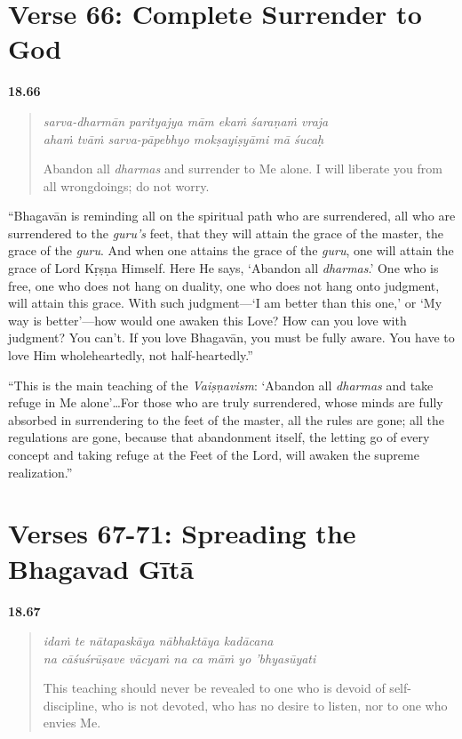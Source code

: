 \section{Verse 66: Complete Surrender to God}\label{sec-verse-66-complete-surrender-to-god}


\par\noindent\textbf{18.66}\par
\begin{verse}
\textit{sarva-dharmān parityajya mām ekaṁ śaraṇaṁ vraja} \\
\textit{ahaṁ tvāṁ sarva-pāpebhyo mokṣayiṣyāmi mā śucaḥ}

\noindent Abandon all \textit{dharmas} and surrender to Me alone. I will liberate you from all wrongdoings; do not worry.
\end{verse}
\par


\enquote{Bhagavān is reminding all on the spiritual path who are surrendered, all who are surrendered to the \textit{guru’s} feet, that they will attain the grace of the master, the grace of the \textit{guru}. And when one attains the grace of the \textit{guru}, one will attain the grace of Lord Kṛṣṇa Himself. Here He says, \enquote{Abandon all \textit{dharmas}.} One who is free, one who does not hang on duality, one who does not hang onto judgment, will attain this grace. With such judgment---\enquote{I am better than this one,} or \enquote{My way is better}---how would one awaken this Love? How can you love with judgment? You can’t. If you love Bhagavān, you must be fully aware. You have to love Him wholeheartedly, not half-heartedly.}

\enquote{This is the main teaching of the \textit{Vaiṣṇavism}: \enquote{Abandon all \textit{dharmas} and take refuge in Me alone}\ldots For those who are truly surrendered, whose minds are fully absorbed in surrendering to the feet of the master, all the rules are gone; all the regulations are gone, because that abandonment itself, the letting go of every concept and taking refuge at the Feet of the Lord, will awaken the supreme realization.}

\section{Verses 67-71: Spreading the Bhagavad Gītā}\label{sec-verses-67-71-spreading-the-bhagavad-gita}


\par\noindent\textbf{18.67}\par
\begin{verse}
\textit{idaṁ te nātapaskāya nābhaktāya kadācana} \\
\textit{na cāśuśrūṣave vācyaṁ na ca māṁ yo ’bhyasūyati}

\noindent This teaching should never be revealed to one who is devoid of self-discipline, who is not devoted, who has no desire to listen, nor to one who envies Me.
\end{verse}
\par



